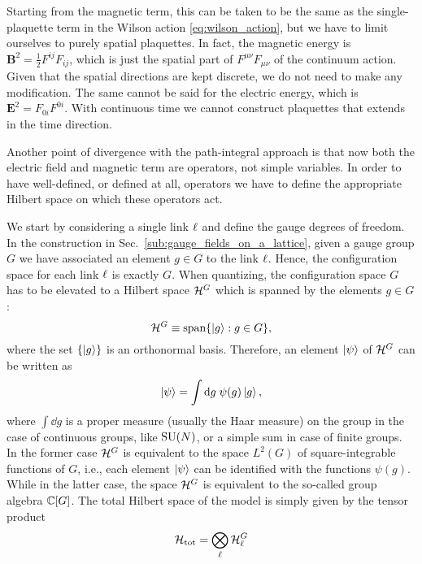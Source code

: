 Starting from the magnetic term, this can be taken to be the same as the single-plaquette term in the Wilson action \eqref{eq:wilson_action}, but we have to limit ourselves to purely spatial plaquettes.
In fact, the magnetic energy is $\bm{B}^2 = \frac{1}{2} F^{ij} F_{ij}$, which is just the spatial part of $F^{\mu \nu} F_{\mu \nu}$ of the continuum action.
Given that the spatial directions are kept discrete, we do not need to make any modification.
The same cannot be said for the electric energy, which is $\bm{E}^2 = F_{0 i} F^{0 i}$.
With continuous time we cannot construct plaquettes that extends in the time direction.

Another point of divergence with the path-integral approach is that now both the electric field and magnetic term are operators, not simple variables.
In order to have well-defined, or defined at all, operators we have to define the appropriate Hilbert space on which these operators act.

We start by considering a single link $\ell$ and define the gauge degrees of freedom.
In  the construction in Sec.~\ref{sub:gauge_fields_on_a_lattice}, given a gauge group $G$ we have associated an element $g \in G$ to the link $\ell$.
Hence, the configuration space for each link $\ell$ is exactly $G$.
When quantizing, the configuration space $G$ has to be elevated to a Hilbert space $\mathcal{H}^G$ which is spanned by the elements $g \in G$:
\begin{equation}
    \mathcal{H}^G \equiv \text{span}\{\ket{g} : g \in G\},
    \label{eq:single_link_Hilbert_space}
\end{equation}
where the set $\{\ket{g}\}$ is an orthonormal basis.
Therefore, an element $\ket{\psi}$ of $\mathcal{H}^G$ can be written as
\begin{equation}
    \ket{\psi} = \int \text{d} g \; \psi(g) \ket{g},
\end{equation}
where $\int \dd g$ is a proper measure (usually the Haar measure) on the group in the case of continuous groups, like $\mathrm{SU}(N)$, or a simple sum in case of finite groups.
In the former case $\mathcal{H}^G$ is equivalent to the space $L^2(G)$ of square-integrable functions of $G$, i.e., each element $\ket{\psi}$ can be identified with the functions $\psi(g)$.
While in the latter case, the space $\mathcal{H}^G$ is equivalent to the so-called group algebra $\mathbb{C}[G]$.
The total Hilbert space of the model is simply given by the tensor product
\begin{equation}
    \mathcal{H}_{\text{tot}} = \bigotimes_{\ell} \mathcal{H}^G_{\ell}
\end{equation}

